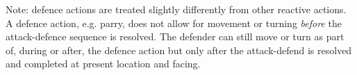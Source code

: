 Note: defence actions are treated slightly differently from other reactive actions. A defence action, e.g. parry, does not allow for movement or turning \emph{before} the attack-defence sequence is resolved. The defender can still move or turn as part of, during or after, the defence action but only after the attack-defend is resolved and completed at present location and facing.



